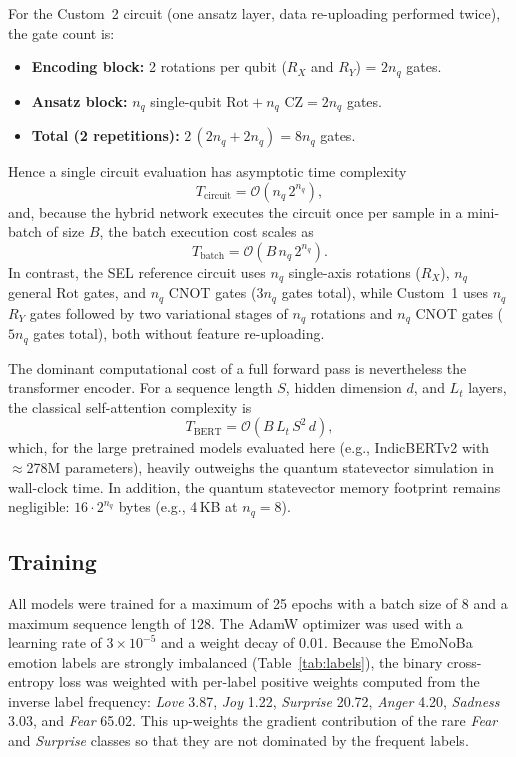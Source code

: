 \documentclass[runningheads]{llncs}
\begin{document}
For the Custom~2 circuit (one ansatz layer, data re-uploading performed twice), the gate count is:
\begin{itemize}[leftmargin=*, nosep, noitemsep]
    \item \textbf{Encoding block:} 2 rotations per qubit ($R_X$ and $R_Y$) = $2n_q$ gates.
    \item \textbf{Ansatz block:} $n_q$ single-qubit $\text{Rot} + n_q\text{ CZ} = 2n_q$ gates.
    \item \textbf{Total (2 repetitions):} $2\,(2n_q + 2n_q) = 8 n_q$ gates.
\end{itemize}
Hence a single circuit evaluation has asymptotic time complexity
\begin{equation}
T_{\text{circuit}} = \mathcal{O}\!\left(n_q \, 2^{n_q}\right),
\end{equation}
and, because the hybrid network executes the circuit once per sample in a mini-batch of size $B$, the batch execution cost scales as
\begin{equation}
T_{\text{batch}} = \mathcal{O}\!\left(B \, n_q \, 2^{n_q}\right).
\end{equation}
In contrast, the SEL reference circuit uses $n_q$ single-axis rotations ($R_X$), $n_q$ general $\text{Rot}$ gates, and $n_q$ CNOT gates ($3n_q$ gates total), while Custom~1 uses $n_q$ $R_Y$ gates followed by two variational stages of $n_q$ rotations and $n_q$ CNOT gates ($5n_q$ gates total), both without feature re-uploading.

The dominant computational cost of a full forward pass is nevertheless the transformer encoder. For a sequence length $S$, hidden dimension $d$, and $L_t$ layers, the classical self-attention complexity is
\begin{equation}
T_{\text{BERT}} = \mathcal{O}\!\left(B\, L_t\, S^2\, d\right),
\end{equation}
which, for the large pretrained models evaluated here (e.g., IndicBERTv2 with $\approx$278M parameters), heavily outweighs the quantum statevector simulation in wall-clock time. In addition, the quantum statevector memory footprint remains negligible: $16 \cdot 2^{n_q}$ bytes (e.g., 4\,KB at $n_q = 8$).

\subsection{Training}\label{sec:training}
All models were trained for a maximum of 25 epochs with a batch size of 8 and a maximum sequence length of 128. The AdamW \cite{loshchilov2019decoupledweightdecayregularization} optimizer was used with a learning rate of $3 \times 10^{-5}$ and a weight decay of 0.01. Because the EmoNoBa emotion labels are strongly imbalanced (Table~\ref{tab:labels}), the binary cross-entropy loss was weighted with per-label positive weights computed from the inverse label frequency: \emph{Love} 3.87, \emph{Joy} 1.22, \emph{Surprise} 20.72, \emph{Anger} 4.20, \emph{Sadness} 3.03, and \emph{Fear} 65.02. This up-weights the gradient contribution of the rare \emph{Fear} and \emph{Surprise} classes so that they are not dominated by the frequent labels.
\end{document}
